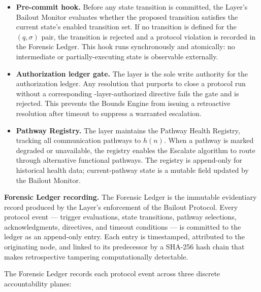 \begin{itemize}\itemsep=0pt
\item[(\textit{i})] \textbf{Pre-commit hook.} Before any state transition is committed, the \fact{} Layer's Bailout Monitor evaluates whether the proposed transition satisfies the current state's enabled transition set. If no transition is defined for the $(q, \sigma)$ pair, the transition is rejected and a protocol violation is recorded in the Forensic Ledger. This hook runs synchronously and atomically: no intermediate or partially-executing state is observable externally.

\item[(\textit{ii})] \textbf{Authorization ledger gate.} The \fact{} layer is the sole write authority for the authorization ledger. Any resolution that purports to close a protocol run without a corresponding \purpose{}-layer-authorized directive fails the gate and is rejected. This prevents the Bounds Engine from issuing a retroactive resolution after timeout to suppress a warranted escalation.

\item[(\textit{iii})] \textbf{Pathway Registry.} The \fact{} layer maintains the Pathway Health Registry, tracking all communication pathways to $h(n)$. When a pathway is marked degraded or unavailable, the registry enables the Escalate algorithm to route through alternative functional pathways. The registry is append-only for historical health data; current-pathway state is a mutable field updated by the Bailout Monitor.
\end{itemize}

\medskip
\noindent\textbf{Forensic Ledger recording.} The Forensic Ledger is the immutable evidentiary record produced by the \fact{} Layer's enforcement of the Bailout Protocol. Every protocol event --- trigger evaluations, state transitions, pathway selections, acknowledgments, directives, and timeout conditions --- is committed to the ledger as an append-only entry. Each entry is timestamped, attributed to the originating node, and linked to its predecessor by a SHA-256 hash chain that makes retrospective tampering computationally detectable.

The Forensic Ledger records each protocol event across three discrete accountability planes:

